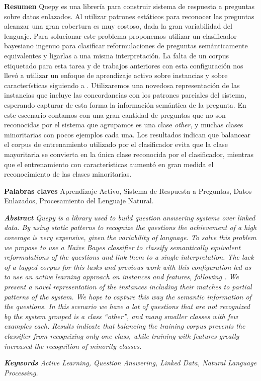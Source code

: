 
\textbf{Resumen} Quepy es una librería para construir sistema de respuesta a preguntas sobre datos enlazados. Al utilizar patrones estáticos para reconocer las preguntas alcanzar una gran cobertura es muy costoso, dada la gran variabilidad del lenguaje. Para solucionar este problema proponemos utilizar un clasificador bayesiano ingenuo para clasificar reformulaciones de preguntas semánticamente equivalentes y ligarlas a una misma interpretación. La falta de un corpus etiquetado para esta tarea y de trabajos anteriores con esta configuración nos llevó a utilizar un enfoque de aprendizaje activo sobre instancias y sobre características siguiendo a \citet{dualist}. Utilizaremos una novedosa representación de las instancias que incluye las concordancias con los patrones parciales del sistema, esperando capturar de esta forma la información semántica de la pregunta. En este escenario contamos con una gran cantidad de preguntas que no son reconocidas por el sistema que agrupamos es una clase \textit{other}, y muchas clases minoritarias con pocos ejemplos cada una. Los resultados indican que balancear el corpus de entrenamiento utilizado por el clasificador evita que la clase mayoritaria se convierta en la única clase reconocida por el clasificador, mientras que el entrenamiento con características aumentó en gran medida el reconocimiento de las clases minoritarias.

\textbf{Palabras claves} Aprendizaje Activo, Sistema de Respuesta a Preguntas, Datos Enlazados, Procesamiento del Lenguaje Natural.

\vspace{5 mm}

\textit{\textbf{Abstract} Quepy is a library used to build question answering systems over linked data. By using static patterns to recognize the questions the achievement of a high coverage is very expensive, given the variability of language. To solve this problem we propose to use a Naïve Bayes classifier to classify semantically equivalent reformulations of the questions and link them to a single interpretation. The lack of a tagged corpus for this tasks and previous work with this configuration led us to use an active learning approach on instances and features, following \citet{dualist}. We present a novel representation of the instances including their matches to partial patterns of the system. We hope to capture this way the semantic information of the questions.  In this scenario we have a lot of questions that are not recognized by the system grouped is a class ``other'', and many smaller classes with few examples each.  Results indicate that balancing the training corpus prevents the classifier from recognizing only one class, while training with features greatly increased the recognition of minority classes.}

\textit{\textbf{Keywords} Active Learning, Question Answering, Linked Data, Natural Language Processing.}